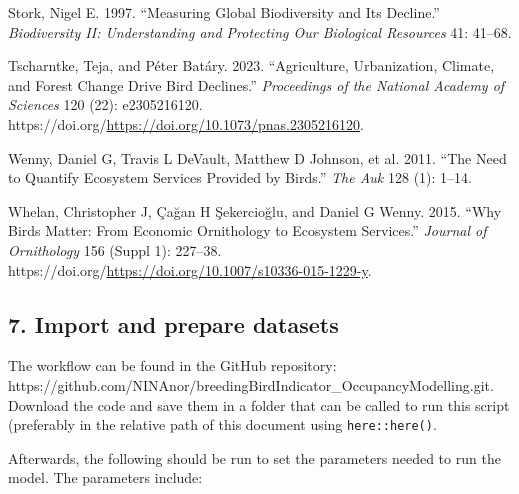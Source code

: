 \documentclass[
  letterpaper,
  DIV=11,
  numbers=noendperiod]{scrartcl}
\newlength{\cslhangindent}
\newenvironment{CSLReferences}[2] %
 {\begin{list}{}{%
  \setlength{\itemindent}{0pt}
  \setlength{\leftmargin}{0pt}
  \setlength{\parsep}{0pt}
  \ifodd #1
   \setlength{\leftmargin}{\cslhangindent}
   \setlength{\itemindent}{-1\cslhangindent}
  \fi
  \setlength{\itemsep}{#2\baselineskip}}}
 {\end{list}}
\begin{document}
\begin{CSLReferences}{1}{1}
Stork, Nigel E. 1997. {``Measuring Global Biodiversity and Its
Decline.''} \emph{Biodiversity II: Understanding and Protecting Our
Biological Resources} 41: 41--68.

Tscharntke, Teja, and Péter Batáry. 2023. {``Agriculture, Urbanization,
Climate, and Forest Change Drive Bird Declines.''} \emph{Proceedings of
the National Academy of Sciences} 120 (22): e2305216120.
https://doi.org/\url{https://doi.org/10.1073/pnas.2305216120}.

Wenny, Daniel G, Travis L DeVault, Matthew D Johnson, et al. 2011.
{``The Need to Quantify Ecosystem Services Provided by Birds.''}
\emph{The Auk} 128 (1): 1--14.

Whelan, Christopher J, Çağan H Şekercioğlu, and Daniel G Wenny. 2015.
{``Why Birds Matter: From Economic Ornithology to Ecosystem Services.''}
\emph{Journal of Ornithology} 156 (Suppl 1): 227--38.
https://doi.org/\url{https://doi.org/10.1007/s10336-015-1229-y}.

\end{CSLReferences}

\subsection{7. Import and prepare
datasets}\label{import-and-prepare-datasets}

The workflow can be found in the GitHub repository:
https://github.com/NINAnor/breedingBirdIndicator\_OccupancyModelling.git.
Download the code and save them in a folder that can be called to run
this script (preferably in the relative path of this document using
\texttt{here::here()}.

Afterwards, the following should be run to set the parameters needed to
run the model. The parameters include:
\end{document}
